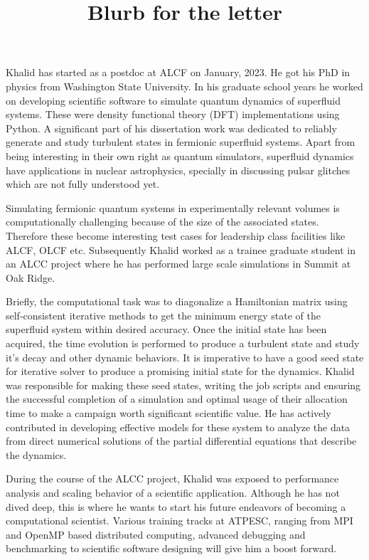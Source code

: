 \documentclass{article}
\title{Blurb for the letter}
\begin{document}
\maketitle

Khalid has started as a postdoc at ALCF on January, 2023. He got his PhD in
physics from Washington State University. In his graduate school years he 
worked on developing scientific software to simulate quantum dynamics of 
superfluid systems. These were density functional theory (DFT) implementations
using Python. A significant part of his dissertation work was dedicated to
reliably generate and study turbulent states in fermionic superfluid systems. 
Apart from being interesting in their own right as quantum simulators, 
superfluid dynamics have applications in nuclear astrophysics, specially in 
discussing pulsar glitches which are not fully understood yet.

Simulating fermionic quantum systems in experimentally relevant volumes is 
computationally challenging because of the size of the associated states. 
Therefore these become interesting test cases for leadership class facilities
like ALCF, OLCF etc. Subsequently Khalid worked as a trainee graduate student
in an ALCC project where he has performed large scale simulations in Summit at
Oak Ridge.

Briefly, the computational task was to diagonalize a Hamiltonian matrix using
self-consistent iterative methods to get the minimum energy state of the 
superfluid system within desired accuracy. Once the initial state has been 
acquired, the time evolution is performed to produce a turbulent state and 
study it's decay and other dynamic behaviors. It is imperative to have a good
seed state for iterative solver to produce a promising initial state for the 
dynamics. Khalid was responsible for making these seed states, writing the job
scripts and ensuring the successful completion of a simulation and optimal 
usage of their allocation time to make a campaign worth significant scientific 
value. He has actively contributed in developing effective models for these
system to analyze the data from direct numerical solutions of the partial 
differential equations that describe the dynamics.

During the course of the ALCC project, Khalid was exposed to performance 
analysis and scaling behavior of a scientific application. Although he has not
dived deep, this is where he wants to start his future endeavors of 
becoming a computational scientist. Various training tracks at ATPESC, ranging 
from MPI and OpenMP
based distributed computing, advanced debugging and benchmarking to scientific 
software designing will give him a boost forward.
\end{document}
